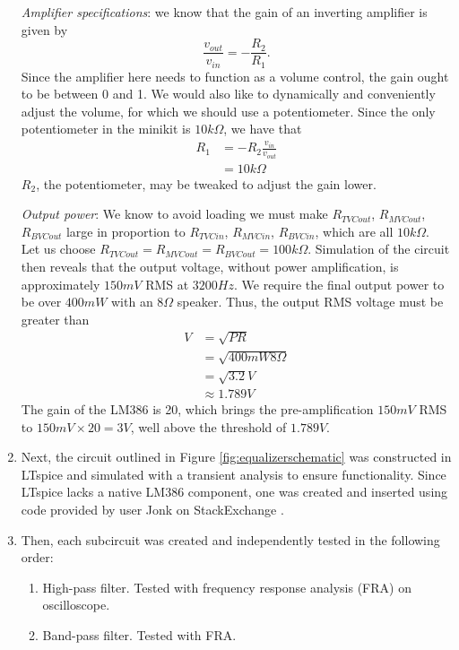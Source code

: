 \documentclass[notitlepage, 12pt]{report}
\begin{document}
\begin{enumerate}
    \emph{Amplifier specifications}: we know that the gain of an inverting 
    amplifier is given by 
        \[\frac{v_{out}}{v_{in}} = -\frac{R_2}{R_1}.\]
    Since the amplifier here needs to function as a volume control, the gain ought 
    to be between 0 and 1. We would also like to dynamically and conveniently adjust the volume, 
    for which we should use a potentiometer. Since the only potentiometer in the minikit 
    is $10 k\Omega$, we have that 
    \begin{align}
        R_1 &= -R_2 \frac{v_{in}}{v_{out}} \\
        &= 10 k\Omega
    \end{align}
    $R_2$, the potentiometer, may be tweaked to adjust the gain lower. 

    \emph{Output power}: We know to avoid loading we must make $R_{TVCout}$, $R_{MVCout}$, $R_{BVCout}$
    large in proportion to $R_{TVCin}$, $R_{MVCin}$, $R_{BVCin}$, which are all $10 k\Omega$. Let us choose 
    $R_{TVCout} = R_{MVCout} = R_{BVCout} = 100 k\Omega$. Simulation of the circuit then 
    reveals that the output voltage, without power amplification, is approximately $150 mV$ RMS at $3200 Hz$. 
    We require the final output power to be over $400 mW$ with an $8 \Omega$ speaker. Thus, the 
    output RMS voltage must be greater than 
    \begin{align*}
        V &= \sqrt{PR} \\
        &= \sqrt{400 mW 8 \Omega} \\
        &= \sqrt{3.2} V \\
        &\approx 1.789 V
    \end{align*}
    The gain of the LM386 is 20, which brings the pre-amplification $150mV$ RMS to $150mV \times 
    20 = 3 V$, well above the threshold of $1.789V$. 
    \item Next, the circuit outlined in Figure \ref{fig:equalizerschematic}
    was constructed in LTspice and simulated with a transient analysis to ensure functionality.
    Since LTspice lacks a native LM386 component, one was created and 
    inserted using code provided by user Jonk on StackExchange \cite{jonk}.
    \item Then, each subcircuit was created and independently tested in the following 
    order:
    \begin{enumerate}
        \item High-pass filter. Tested with frequency response analysis (FRA) on oscilloscope. 
        \item Band-pass filter. Tested with FRA. 

\end{enumerate}
\end{enumerate}
\end{document}
